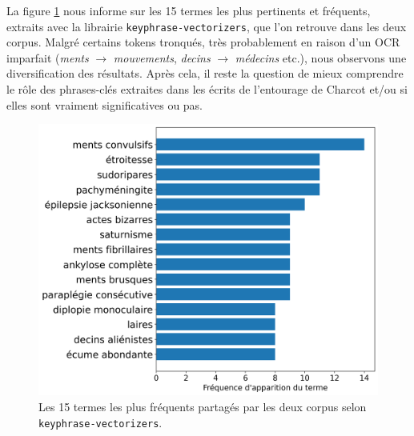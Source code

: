 La figure \ref{fig:patternrank_partage} nous informe sur les 15 termes les plus pertinents et fréquents, extraits avec la librairie \texttt{keyphrase-vectorizers}, que l'on retrouve dans les deux corpus. Malgré certains tokens tronqués, très probablement en raison d'un \textsc{OCR} imparfait (\textit{ments} $\rightarrow$ \textit{mouvements}, \textit{decins} $\rightarrow$ \textit{médecins} etc.), nous observons une diversification des résultats. Après cela, il reste la question de mieux comprendre le rôle des phrases-clés extraites dans les écrits de l'entourage de Charcot et/ou si elles sont vraiment significatives ou pas. 

\begin{figure}[!h]
    \centering
    \includegraphics[width=1\textwidth]{img/termes_partages.png}
    \caption{Les 15 termes les plus fréquents partagés par les deux corpus selon \texttt{keyphrase-vectorizers}.}
    \label{fig:patternrank_partage}
\end{figure}
